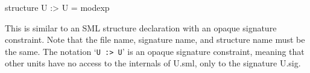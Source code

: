 \documentclass[fleqn,a4paper]{article}
\begin{document}
\begin{program}
structure U :> U = {\rm modexp} 
\end{program}


\noindent This is similar to an SML structure declaration with an
opaque signature constraint.  Note that the file name, signature name,
and structure name must be the same.  The notation `{\tt U :> U}' is
an opaque signature constraint, meaning that other units have no
access to the internals of U.sml, only to the signature U.sig.










\end{document}
